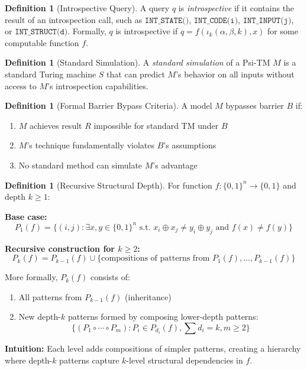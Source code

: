 \documentclass[11pt]{article}
\theoremstyle{definition}
\newtheorem{definition}[theorem]{Definition}
\begin{document}
\begin{definition}[Introspective Query]
A query $q$ is \textit{introspective} if it contains the result of an introspection call, such as $\texttt{INT\_STATE()}$, $\texttt{INT\_CODE(i)}$, $\texttt{INT\_INPUT(j)}$, or $\texttt{INT\_STRUCT(d)}$. Formally, $q$ is introspective if $q = f(\iota_k(\alpha, \beta, k), x)$ for some computable function $f$.
\end{definition}

\begin{definition}[Standard Simulation]
A \textit{standard simulation} of a Psi-TM $M$ is a standard Turing machine $S$ that can predict $M$'s behavior on all inputs without access to $M$'s introspection capabilities.
\end{definition}

\begin{definition}[Formal Barrier Bypass Criteria]
A model $M$ bypasses barrier $B$ if:
\begin{enumerate}
\item $M$ achieves result $R$ impossible for standard TM under $B$
\item $M$'s technique fundamentally violates $B$'s assumptions
\item No standard method can simulate $M$'s advantage
\end{enumerate}
\end{definition}

\begin{definition}[Recursive Structural Depth]
For function $f: \{0,1\}^n \to \{0,1\}$ and depth $k \geq 1$:

\textbf{Base case:}
$$P_1(f) = \{(i,j) : \exists x,y \in \{0,1\}^n \text{ s.t. } x_i \oplus x_j \neq y_i \oplus y_j \text{ and } f(x) \neq f(y)\}$$

\textbf{Recursive construction for $k \geq 2$:}
$$P_k(f) = P_{k-1}(f) \cup \{\text{compositions of patterns from } P_1(f), \ldots, P_{k-1}(f)\}$$

More formally, $P_k(f)$ consists of:
\begin{enumerate}
\item All patterns from $P_{k-1}(f)$ (inheritance)
\item New depth-$k$ patterns formed by composing lower-depth patterns:
   $$\{(P_1 \circ \cdots \circ P_m) : P_i \in P_{d_i}(f), \sum d_i = k, m \geq 2\}$$
\end{enumerate}

\textbf{Intuition:} Each level adds compositions of simpler patterns, creating a hierarchy where depth-$k$ patterns capture $k$-level structural dependencies in $f$.
\end{definition}
\end{document}
